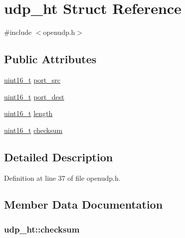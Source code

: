 \hypertarget{structudp__ht}{}\section{udp\+\_\+ht Struct Reference}
\label{structudp__ht}


{\ttfamily \#include $<$openudp.\+h$>$}

\subsection*{Public Attributes}
\begin{DoxyCompactItemize}
\item 
\hyperlink{_p_e___types_8h_a1f1825b69244eb3ad2c7165ddc99c956}{uint16\+\_\+t} \hyperlink{structudp__ht_a6b915a906282e762b94c548196a450f3}{port\+\_\+src}
\item 
\hyperlink{_p_e___types_8h_a1f1825b69244eb3ad2c7165ddc99c956}{uint16\+\_\+t} \hyperlink{structudp__ht_ab48fdc2cf04ca5a87eaa43dfa96e9458}{port\+\_\+dest}
\item 
\hyperlink{_p_e___types_8h_a1f1825b69244eb3ad2c7165ddc99c956}{uint16\+\_\+t} \hyperlink{structudp__ht_a5c8de54e3590abf0847e75d70bee6c54}{length}
\item 
\hyperlink{_p_e___types_8h_a1f1825b69244eb3ad2c7165ddc99c956}{uint16\+\_\+t} \hyperlink{structudp__ht_ab8911ea8cefaccf7cf600d77fa21fd6c}{checksum}
\end{DoxyCompactItemize}


\subsection{Detailed Description}


Definition at line 37 of file openudp.\+h.



\subsection{Member Data Documentation}
\subsubsection[{\texorpdfstring{checksum}{checksum}}]{ udp\+\_\+ht\+::checksum}\hypertarget{structudp__ht_ab8911ea8cefaccf7cf600d77fa21fd6c}{}\label{structudp__ht_ab8911ea8cefaccf7cf600d77fa21fd6c}


